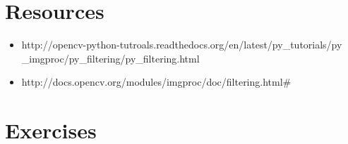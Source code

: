 \documentclass[]{article}
\providecommand{\tightlist}{%
  \setlength{\itemsep}{0pt}\setlength{\parskip}{0pt}}
\begin{document}
\newpage
\section{Resources}\label{resources}

\begin{itemize}
\tightlist
\item
  http://opencv-python-tutroals.readthedocs.org/en/latest/py\_tutorials/py
  \_imgproc/py\_filtering/py\_filtering.html
\item
  http://docs.opencv.org/modules/imgproc/doc/filtering.html\#
\end{itemize}

\section{Exercises}\label{exercises}
\end{document}
